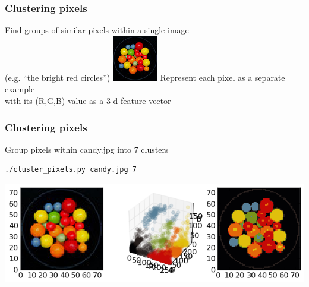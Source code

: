 \begin{frame}
  \frametitle{Clustering pixels}

  \begin{center}
    Find groups of similar pixels within a single image \\
    (e.g. ``the bright red circles'')
    \vskip20pt
    \includegraphics[height=0.25\textheight]{../../code/image_data/candy.jpg}
    \vskip20pt
    Represent each pixel as a separate example \\
    with its (R,G,B) value as a 3-d feature vector
  \end{center}

\end{frame}


\begin{frame}[fragile]
  \frametitle{Clustering pixels}

  \begin{center}

    \begin{block}{Group pixels within candy.jpg into 7 clusters}
        \begin{lstlisting}[language=bash]
 ./cluster_pixels.py candy.jpg 7
        \end{lstlisting}
    \end{block}
    \vskip20pt
    \includegraphics[width=\textwidth]{../../code/image_data/candy_clustered.png}
  \end{center}

\end{frame}

